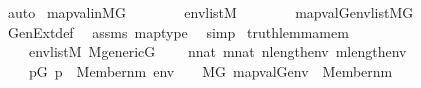 \begin{isabellebody}
\ {\isacharparenleft}{\kern0pt}auto{\isacharparenright}{\kern0pt}\isanewline
{}\isamarkupfalse%
%
\endisatagproof
{\isafoldproof}%
%
\isadelimproof
\isanewline
%
\endisadelimproof
\isanewline
{}\isamarkupfalse%
\ map{\isacharunderscore}{\kern0pt}val{\isacharunderscore}{\kern0pt}in{\isacharunderscore}{\kern0pt}MG{\isacharcolon}{\kern0pt}\isanewline
\ \ \ \isanewline
\ \ \ \ {\isachardoublequoteopen}env{\isasymin}list{\isacharparenleft}{\kern0pt}M{\isacharparenright}{\kern0pt}{\isachardoublequoteclose}\isanewline
\ \ \ \isanewline
\ \ \ \ {\isachardoublequoteopen}map{\isacharparenleft}{\kern0pt}val{\isacharparenleft}{\kern0pt}G{\isacharparenright}{\kern0pt}{\isacharcomma}{\kern0pt}env{\isacharparenright}{\kern0pt}{\isasymin}list{\isacharparenleft}{\kern0pt}M{\isacharbrackleft}{\kern0pt}G{\isacharbrackright}{\kern0pt}{\isacharparenright}{\kern0pt}{\isachardoublequoteclose}\isanewline
%
\isadelimproof
\ \ %
\endisadelimproof
%
\isatagproof
{}\isamarkupfalse%
\ GenExt{\isacharunderscore}{\kern0pt}def\ \isamarkupfalse%
\ assms\ map{\isacharunderscore}{\kern0pt}type{}\ \isamarkupfalse%
\ simp%
\endisatagproof
{\isafoldproof}%
%
\isadelimproof
\isanewline
%
\endisadelimproof
\isanewline
{}\isamarkupfalse%
\ truth{\isacharunderscore}{\kern0pt}lemma{\isacharunderscore}{\kern0pt}mem{\isacharcolon}{\kern0pt}\isanewline
\ \ \ \isanewline
\ \ \ \ {\isachardoublequoteopen}env{\isasymin}list{\isacharparenleft}{\kern0pt}M{\isacharparenright}{\kern0pt}{\isachardoublequoteclose}\ {\isachardoublequoteopen}M{\isacharunderscore}{\kern0pt}generic{\isacharparenleft}{\kern0pt}G{\isacharparenright}{\kern0pt}{\isachardoublequoteclose}\isanewline
\ \ \ \ {\isachardoublequoteopen}n{\isasymin}nat{\isachardoublequoteclose}\ {\isachardoublequoteopen}m{\isasymin}nat{\isachardoublequoteclose}\ {\isachardoublequoteopen}n{\isacharless}{\kern0pt}length{\isacharparenleft}{\kern0pt}env{\isacharparenright}{\kern0pt}{\isachardoublequoteclose}\ {\isachardoublequoteopen}m{\isacharless}{\kern0pt}length{\isacharparenleft}{\kern0pt}env{\isacharparenright}{\kern0pt}{\isachardoublequoteclose}\isanewline
\ \ \ \isanewline
\ \ \ \ {\isachardoublequoteopen}{\isacharparenleft}{\kern0pt}{\isasymexists}p{\isasymin}G{\isachardot}{\kern0pt}\ p\ {\isasymtturnstile}\ Member{\isacharparenleft}{\kern0pt}n{\isacharcomma}{\kern0pt}m{\isacharparenright}{\kern0pt}\ env{\isacharparenright}{\kern0pt}\ \ {\isasymlongleftrightarrow}\ \ M{\isacharbrackleft}{\kern0pt}G{\isacharbrackright}{\kern0pt}{\isacharcomma}{\kern0pt}\ map{\isacharparenleft}{\kern0pt}val{\isacharparenleft}{\kern0pt}G{\isacharparenright}{\kern0pt}{\isacharcomma}{\kern0pt}env{\isacharparenright}{\kern0pt}\ {\isasymTurnstile}\ Member{\isacharparenleft}{\kern0pt}n{\isacharcomma}{\kern0pt}m{\isacharparenright}{\kern0pt}{\isachardoublequoteclose}\isanewline

\end{isabellebody}
